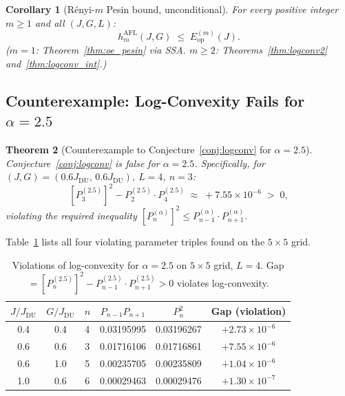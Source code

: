 \documentclass[12pt,a4paper]{article}
\newtheorem{theorem}{Theorem}[section]
\newtheorem{corollary}[theorem]{Corollary}
\begin{document}
\begin{corollary}[Rényi-$m$ Pesin bound, unconditional]
\label{cor:renyi_m_unconditional}
For every positive integer $m\geq 1$ and all $(J,G,L)$:
\[
  h_m^{\mathrm{AFL}}(J,G)\;\leq\; E_{\mathrm{op}}^{(m)}(J).
\]
($m=1$: Theorem~\ref{thm:oe_pesin} via SSA. $m\geq 2$: Theorems~\ref{thm:logconv2} and~\ref{thm:logconv_int}.)
\end{corollary}

\subsection{Counterexample: Log-Convexity Fails for $\alpha=2.5$}
\label{sec:logconv_counterex}

\begin{theorem}[Counterexample to Conjecture~\ref{conj:logconv} for $\alpha=2.5$]
\label{thm:counterex}
Conjecture~\ref{conj:logconv} is \emph{false} for $\alpha=2.5$.
Specifically, for $(J,G)=(0.6J_\mathrm{DU},\,0.6J_\mathrm{DU})$, $L=4$, $n=3$:
\[
  \left[P_3^{(2.5)}\right]^2 - P_2^{(2.5)}\cdot P_4^{(2.5)}
  \;\approx\; +7.55\times10^{-6}\; >\; 0,
\]
violating the required inequality $[P_n^{(\alpha)}]^2\leq P_{n-1}^{(\alpha)}\cdot P_{n+1}^{(\alpha)}$.
\end{theorem}

Table~\ref{tab:logconv_viol} lists all four violating parameter triples found on the $5\times5$ grid.

\begin{table}[h!]
\centering
\caption{Violations of log-convexity for $\alpha=2.5$ on $5\times5$ grid, $L=4$.
Gap $= [P_n^{(2.5)}]^2 - P_{n-1}^{(2.5)}\cdot P_{n+1}^{(2.5)} > 0$ violates log-convexity.}
\label{tab:logconv_viol}
\begin{tabular}{c|c|c|c|c|c}
$J/J_\mathrm{DU}$ & $G/J_\mathrm{DU}$ & $n$ & $P_{n-1}P_{n+1}$ & $P_n^2$ & Gap (violation)\\
\hline
0.4 & 0.4 & 4 & 0.03195995 & 0.03196267 & $+2.73\times10^{-6}$\\
0.6 & 0.6 & 3 & 0.01716106 & 0.01716861 & $+7.55\times10^{-6}$\\
0.6 & 1.0 & 5 & 0.00235705 & 0.00235809 & $+1.04\times10^{-6}$\\
1.0 & 0.6 & 6 & 0.00029463 & 0.00029476 & $+1.30\times10^{-7}$\\
\end{tabular}
\end{table}
\end{document}
